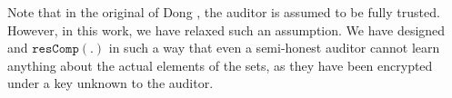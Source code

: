 Note that in the original  \SCpc of Dong \et \cite{dong2017betrayal}, the auditor is assumed to be fully trusted. However, in this work, we have relaxed such an assumption. We have designed \epsi and $\mathtt{resComp}(.)$ in such a way that even a semi-honest auditor cannot learn anything about the actual elements of the sets, as they have been encrypted under a key unknown to the auditor. 























